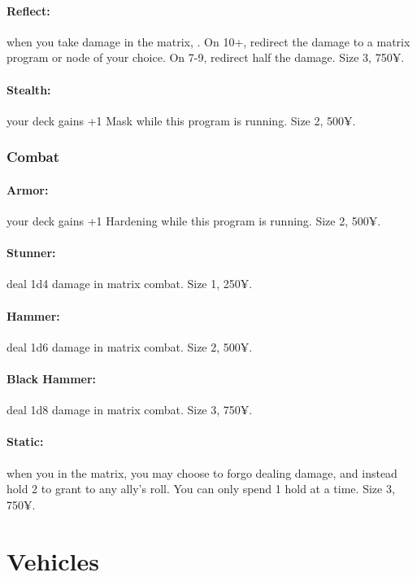 \paragraph{Reflect:} when you take damage in the matrix, . On 10+, redirect the damage to a matrix program or node of your choice. On 7-9, redirect half the damage. Size 3, 750¥.

\paragraph{Stealth:} your deck gains +1 Mask while this program is running. Size 2, 500¥.

\subsubsection{Combat}
\paragraph{Armor:} your deck gains +1 Hardening while this program is running. Size 2, 500¥.

\paragraph{Stunner:} deal 1d4 damage in matrix combat. Size 1, 250¥.

\paragraph{Hammer:} deal 1d6 damage in matrix combat. Size 2, 500¥.

\paragraph{Black Hammer:} deal 1d8 damage in matrix combat. Size 3, 750¥.

\paragraph{Static:} when you  in the matrix, you may choose to forgo dealing damage, and instead hold 2 to grant to any ally’s roll. You can only spend 1 hold at a time. Size 3, 750¥.


\section{Vehicles}

